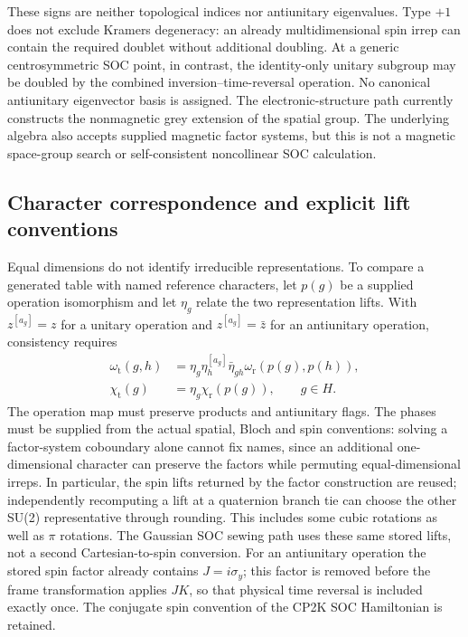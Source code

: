 These signs are neither topological indices nor antiunitary
eigenvalues. Type $+1$ does not exclude Kramers degeneracy: an
already multidimensional spin irrep can contain the required doublet
without additional doubling. At a generic centrosymmetric SOC point,
in contrast, the identity-only unitary subgroup may be doubled by
the combined inversion--time-reversal operation.
No canonical antiunitary eigenvector basis is assigned.
The electronic-structure path currently constructs the nonmagnetic
grey extension of the spatial group. The underlying algebra also
accepts supplied magnetic factor systems, but this is not a magnetic
space-group search or self-consistent noncollinear SOC calculation.

\subsection{Character correspondence and explicit lift conventions}
Equal dimensions do not identify irreducible representations.
To compare a generated table with named reference characters, let
$p(g)$ be a supplied operation isomorphism and let $\eta_g$ relate
the two representation lifts. With $z^{[a_g]}=z$ for a unitary
operation and $z^{[a_g]}=\bar z$ for an antiunitary operation, consistency
requires
\begin{align}
 \omega_{\mathrm{t}}(g,h)
 &=\eta_g\eta_h^{[a_g]}\bar\eta_{gh}
       \omega_{\mathrm{r}}(p(g),p(h)), \\
 \chi_{\mathrm{t}}(g)&=\eta_g\chi_{\mathrm{r}}(p(g)),\qquad g\in H.
 \label{eq:character-reference-map}
\end{align}
The operation map must preserve products and antiunitary flags.
The phases must be supplied from the actual spatial, Bloch and spin
conventions: solving a factor-system coboundary alone cannot fix
names, since an additional one-dimensional character can preserve
the factors while permuting equal-dimensional irreps. In particular,
the spin lifts returned by the factor construction are reused;
independently recomputing a lift at a quaternion branch tie can choose
the other SU(2) representative through rounding. This includes some
cubic rotations as well as $\pi$ rotations. The Gaussian SOC sewing
path uses these same stored lifts, not a second Cartesian-to-spin
conversion. For an antiunitary operation the stored spin factor
already contains $J=i\sigma_y$; this factor is removed before the
frame transformation applies $JK$, so that physical time reversal
is included exactly once. The conjugate spin convention of the
CP2K SOC Hamiltonian is retained.

